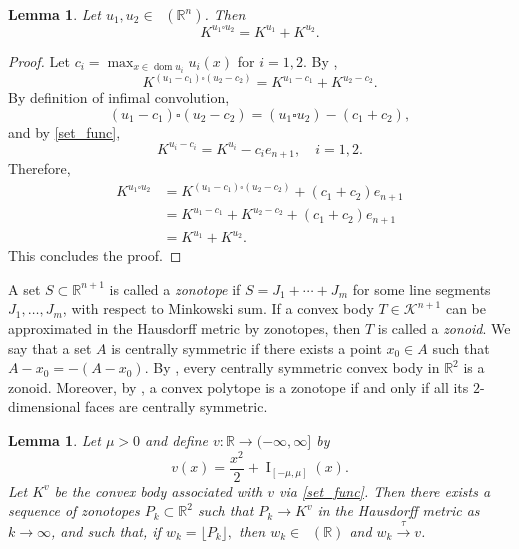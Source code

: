 \documentclass[11pt]{article}
\newtheorem{lema}[teo]{Lemma}
\theoremstyle{definition} %
\DeclareMathOperator{\I}{I}
\DeclareMathOperator{\dom}{dom}
\DeclareMathOperator{\LC}{Conv_{ld}}
\DeclareMathOperator{\LP}{Conv_{lp}}
\newcommand{\seq}{\xrightarrow{\tau}}
\begin{document}
\begin{lema}\label{inf_sum}
Let $u_1,u_2 \in \LC(\mathbb{R}^n)$. Then
\[
K^{u_1 \square u_2}= K^{u_1}+K^{u_2}.
\]
\end{lema}


\begin{proof}
Let $c_i=\max_{x\in \dom u_i} u_i(x)$ for $i=1,2$. By \cite[Lemma 5.1]{mussnig2026inequalities},
\[
K^{(u_1-c_1)\square (u_2-c_2)} = K^{u_1-c_1}+K^{u_2-c_2}.
\]
By definition of infimal convolution,
\[
(u_1-c_1)\square(u_2-c_2) = (u_1\square u_2) - (c_1+c_2),
\]
and by \eqref{set_func},
\[
K^{u_i-c_i} = K^{u_i} - c_i e_{n+1}, \quad i=1,2.
\]
Therefore,
\begin{align*}
K^{u_1\square u_2}
&= K^{(u_1-c_1)\square (u_2-c_2)} + (c_1+c_2)e_{n+1} \\
&= K^{u_1-c_1} + K^{u_2-c_2} + (c_1+c_2)e_{n+1} \\
&= K^{u_1}+K^{u_2}.
\end{align*}
This concludes the proof.
\end{proof}



A set $S\subset\mathbb{R}^{n+1}$ is called a \textit{zonotope} if $S= J_1+\cdots+J_m$ for some line segments $J_1,\dots,J_m$, with respect to Minkowski sum. If a convex body $T\in\mathcal{K}^{n+1}$ can be approximated in the Hausdorff metric by zonotopes, then $T$ is called a \textit{zonoid}. We say that a set $A$ is centrally symmetric if there exists a point $x_0 \in A$ such that
\(
A - x_0 = -(A - x_0).
\) By \cite[Corollary 3.5.7]{schneider2014convex}, every centrally symmetric convex body in $\mathbb{R}^2$ is a zonoid. Moreover, by \cite[Theorem 3.5.2]{schneider2014convex}, a convex polytope is a zonotope if and only if all its $2$-dimensional faces are centrally symmetric.

\begin{lema}\label{lemma:zonotope-approx}
Let $\mu>0$ and define $v:\mathbb{R}\to(-\infty, \infty]$ by
\[
v(x)=\frac{x^2}{2}+\I_{[-\mu,\mu]}(x).
\]
Let $K^v$ be the convex body associated with $v$ via \eqref{set_func}. Then there exists a sequence of zonotopes $P_k \subset \mathbb{R}^2$ such that $P_k \to K^v$ in the Hausdorff metric as $k\to\infty$, and such that, if
\(
w_k=\lfloor P_k\rfloor,
\)
then $w_k\in\LP(\mathbb{R})$ and $w_k\seq v$.
\end{lema}
\end{document}
